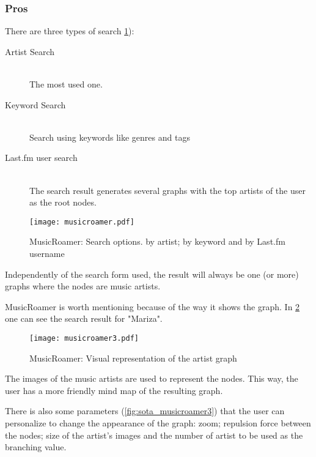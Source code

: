     \subsubsection{Pros} %
    \label{ssub:pros}

      There are three types of search \ref{fig:sota_musicroamer}): 

      \begin{description}
        \item[Artist Search] \hfill \\
          The most used one.
        \item[Keyword Search] \hfill \\
          Search using keywords like genres and tags
        \item[Last.fm user search] \hfill \\
          The search result generates several graphs with the top artists of the user as the root nodes.
      \end{description}

      \begin{figure}[hb]
        \begin{center}
          \texttt{[image: musicroamer.pdf]}
        \end{center}
        \caption{MusicRoamer: Search options. by artist; by keyword and by Last.fm username}
        \label{fig:sota_musicroamer}
      \end{figure}

      Independently of the search form used, the result will always be one (or more) graphs where the nodes are music artists.

      MusicRoamer is worth mentioning because of the way it shows the graph.
      In \ref{fig:sota_musicroamer2} one can see the search result for "Mariza".

      \begin{figure}[!ht]
        \begin{center}
          \texttt{[image: musicroamer3.pdf]}
        \end{center}
        \caption{MusicRoamer: Visual representation of the artist graph}
        \label{fig:sota_musicroamer2}
      \end{figure}

      The images of the music artists are used to represent the nodes. This way, the user has a more friendly mind map of the resulting graph.

      There is also some parameters (\ref{fig:sota_musicroamer3}) that the user can personalize to change the appearance of the graph: zoom; repulsion force between the nodes; size of the artist's images and the number of artist to be used as the branching value.


